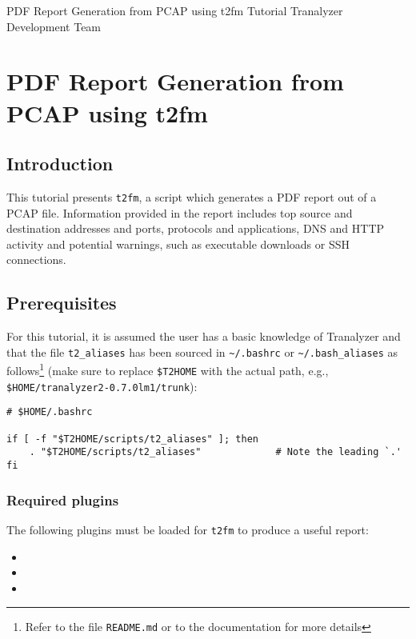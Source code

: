 \documentclass[documentation]{subfiles}
\begin{document}
\trantitle
    {PDF Report Generation from PCAP using t2fm}
    {Tutorial} %
    {Tranalyzer Development Team} %

\section{PDF Report Generation from PCAP using t2fm}\label{t2fm_tutorial}

\subsection{Introduction}
This tutorial presents {\tt t2fm}, a script which generates a PDF report out of a PCAP file. Information provided in the report includes top source and destination addresses and ports, protocols and applications, DNS and HTTP activity and potential warnings, such as executable downloads or SSH connections. %

\subsection{Prerequisites}\label{s:t2fm-prereq}
For this tutorial, it is assumed the user has a basic knowledge of Tranalyzer and that the file {\tt t2\_aliases} has been sourced in {\tt\textasciitilde{}/.bashrc} or {\tt\textasciitilde{}/.bash\_aliases} as follows\footnote{Refer to the file {\tt README.md} or to the documentation for more details} (make sure to replace {\tt\$T2HOME} with the actual path, e.g., {\tt\$HOME/tranalyzer2-0.7.0lm1/trunk}):\\
\begin{verbatim}
# $HOME/.bashrc

if [ -f "$T2HOME/scripts/t2_aliases" ]; then
    . "$T2HOME/scripts/t2_aliases"             # Note the leading `.'
fi
\end{verbatim}

    \subsubsection{Required plugins}
        The following plugins must be loaded for {\tt t2fm} to produce a useful report:
        \begin{multicols}{3}
            \begin{itemize}
                \item {}
                \item {}
                \item {}
            \end{itemize}
        \end{multicols}
\end{document}

